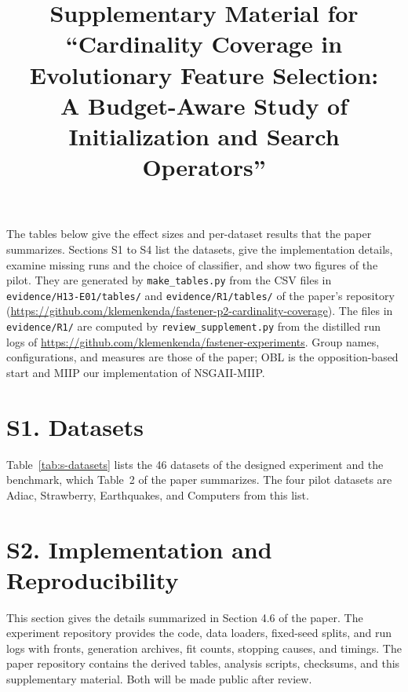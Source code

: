 \documentclass[10pt]{article}
\title{Supplementary Material for\\
``Cardinality Coverage in Evolutionary Feature Selection:\\
A Budget-Aware Study of Initialization and Search Operators''}
\date{}
\newif\ifanonymous
\begin{document}
\maketitle

The tables below give the effect sizes and per-dataset results that the paper summarizes. Sections S1 to S4 list the datasets, give the implementation details, examine missing runs and the choice of classifier, and show two figures of the pilot. \ifanonymous They
are generated by \texttt{make\_tables.py} from the CSV files in the paper's repository, which, like the experiment repository with the distilled run logs, will be made public after review. \else They
are generated by \texttt{make\_tables.py} from the CSV files in \texttt{evidence/H13-E01/tables/}
and \texttt{evidence/R1/tables/} of the paper's repository
(\url{https://github.com/klemenkenda/fastener-p2-cardinality-coverage}). The files in
\texttt{evidence/R1/} are computed by \texttt{review\_supplement.py} from the distilled run logs of
\url{https://github.com/klemenkenda/fastener-experiments}.\fi
Group names, configurations, and
measures are those of the paper; OBL is the opposition-based start and MIIP our implementation of
NSGAII-MIIP.




\clearpage
\section*{S1. Datasets}

Table~\ref{tab:s-datasets} lists the 46 datasets of the designed experiment and the benchmark, which Table~2 of the paper summarizes. The four pilot datasets are Adiac, Strawberry, Earthquakes, and Computers from this list.



\clearpage
\section*{S2. Implementation and Reproducibility}

\ifanonymous
This section gives the details summarized in Section 4.6 of the paper. The experiment repository provides the code, data loaders, fixed-seed splits, and run logs with fronts, generation archives, fit counts, stopping causes, and timings. The paper repository contains the derived tables, analysis scripts, checksums, and this supplementary material. Both will be made public after review.
\end{document}

